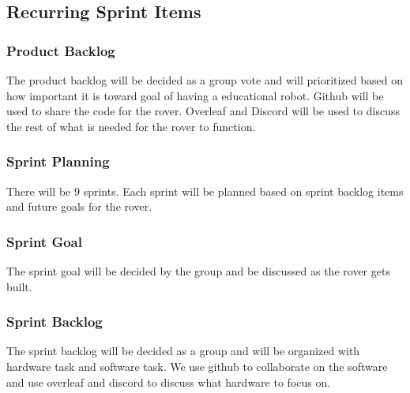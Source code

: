 \subsection{Recurring Sprint Items}

\subsubsection{Product Backlog}
The product backlog will be decided as a group vote and will prioritized based on how important it is toward goal of having a educational robot. Github will be used to share the code for the rover. Overleaf and Discord will be used to discuss the rest of what is needed for the rover to function.

\subsubsection{Sprint Planning}
There will be 9 sprints. Each sprint will be planned based on sprint backlog items and future goals for the rover.

\subsubsection{Sprint Goal}
The sprint goal will be decided by the group and be discussed as the rover gets built.

\subsubsection{Sprint Backlog}
The sprint backlog will be decided as a group and will be organized with hardware task and software task. We use github to collaborate on the software and use overleaf and discord to discuss what hardware to focus on.


